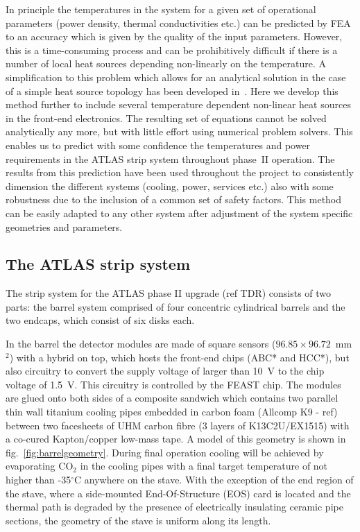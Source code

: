 In principle the temperatures in the system for a given set of operational parameters (power density, thermal conductivities etc.) can be predicted by FEA to an accuracy which is given by the quality of the input parameters. However, this is a time-consuming process and can be prohibitively difficult if there is a number of local heat sources depending non-linearly on the temperature. A simplification to this problem which allows for an analytical solution in the case of a simple heat source topology has been developed in~\cite{Beck:2010zzd}. Here we develop this method further to include several temperature dependent non-linear heat sources in the front-end electronics. The resulting set of equations cannot be solved analytically any more, but with little effort using numerical problem solvers. This enables us to predict with some confidence the temperatures and power requirements in the ATLAS strip system throughout phase~II operation. The results from this prediction have been used throughout the project to consistently dimension the different systems (cooling, power, services etc.) also with some robustness due to the inclusion of a common set of safety factors. This method can be easily adapted to any other system after adjustment of the system specific geometries and parameters.

\subsection{The ATLAS strip system}
The strip system for the ATLAS phase II upgrade (ref TDR) consists of two parts: the barrel system comprised of four concentric cylindrical barrels and the two endcaps, which consist of six disks each.

In the barrel the detector modules are made of square sensors ($96.85\times 96.72$~mm$^2$) with a hybrid on top, which hosts the front-end chips (ABC* and HCC*), but also circuitry to convert the supply voltage of larger than 10~V to the chip voltage of 1.5~V. This circuitry is controlled by the FEAST chip. The modules are glued onto both sides of a composite sandwich which contains two parallel thin wall titanium cooling pipes embedded in carbon foam (Allcomp K9 - ref)  between two facesheets of UHM carbon fibre (3 layers of K13C2U/EX1515) with a co-cured Kapton/copper low-mass tape. A model of this geometry is shown in fig.~\ref{fig:barrelgeometry}. During final operation cooling will be achieved by evaporating CO$_2$ in the cooling pipes with a final target temperature of not higher than -35$^\circ$C anywhere on the stave. With the exception of the end region of the stave, where a side-mounted End-Of-Structure (EOS) card is located and the thermal path is degraded by the presence of electrically insulating ceramic pipe sections, the geometry of the stave is uniform along its length. 

